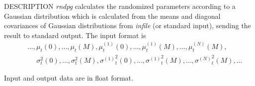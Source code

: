 \begin{qsection}{DESCRIPTION}
	{\em rndpg} calculates the randomized parameters 
	according to a Gaussian distribution which is calculated
	from the means and diagonal covariances of Gaussian distributions 
	from {\em infile} (or standard input),
	sending the result to standard output.
	The input format is
 \begin{eqnarray}
	&& \ldots, \mu_t(0), \ldots, \mu_t(M),
		\mu^{(1)}_t(0), \ldots, \mu^{(1)}_t(M),
		\ldots, \mu^{(N)}_t(M),
		\nonumber\\
	&& ~~~~~~\sigma^2_t(0), \ldots, \sigma^2_t(M),
		{\sigma^{(1)}}^2_t(0), \ldots, {\sigma^{(1)}}^2_t(M),
		\ldots, {\sigma^{(N)}}^2_t(M),
		\ldots \nonumber
 \end{eqnarray}

	Input and output data are in float format.

\end{qsection}

